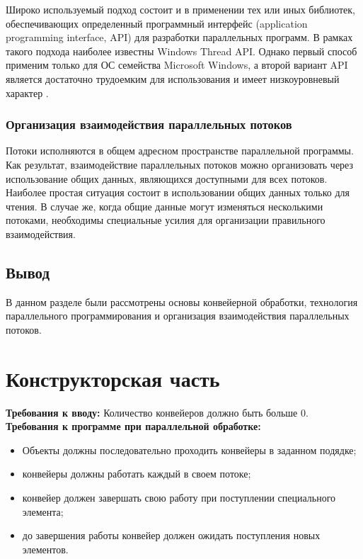 \documentclass[12pt]{report}
\begin{document}
Широко используемый подход состоит и в применении тех или иных библиотек, обеспечивающих определенный программный интерфейс (application programming interface, API) для разработки параллельных программ. В рамках такого подхода наиболее известны Windows Thread API. Однако первый способ применим только для ОС семейства Microsoft Windows, а второй вариант API является достаточно трудоемким для использования и имеет низкоуровневый характер \cite{Barkalov}.

\subsection{Организация взаимодействия параллельных потоков}
Потоки исполняются в общем адресном пространстве параллельной программы. Как результат, взаимодействие параллельных потоков можно организовать через использование общих данных, являющихся доступными для всех потоков. Наиболее простая ситуация состоит в использовании общих данных только для чтения. В случае же, когда общие данные могут изменяться несколькими потоками, необходимы специальные усилия для организации правильного взаимодействия.

\section{Вывод}
В данном разделе были рассмотрены основы конвейерной обработки, технология параллельного программирования и
организация взаимодействия параллельных потоков.



\chapter{Конструкторская часть}
\textbf{Требования к вводу:}
Количество конвейеров должно быть больше 0.
\newline
\textbf{Требования к программе при параллельной обработке:}
\begin{itemize}
\item Объекты должны последовательно проходить конвейеры в заданном подядке;
\item конвейеры должны работать каждый в своем потоке;
\item конвейер должен завершать свою работу при поступлении специального элемента;
\item до завершения работы конвейер должен ожидать поступления новых элементов.
\end{itemize}
\end{document}
